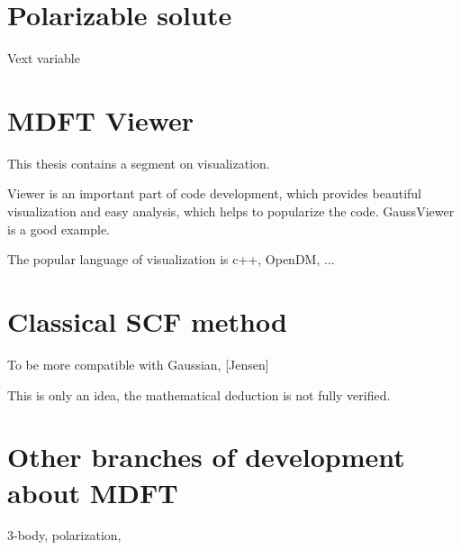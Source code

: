 \section{Polarizable solute}

Vext variable

\section{MDFT Viewer}

This thesis contains a segment on visualization.

Viewer is an important part of code development, which provides beautiful
visualization and easy analysis, which helps to popularize the code. GaussViewer
is a good example.

The popular language of visualization is c++, OpenDM, ...

\section{Classical SCF method}

To be more compatible with Gaussian, {[}Jensen{]}

This is only an idea, the mathematical deduction is not fully verified.

\section{Other branches of development about MDFT}

3-body, polarization, 
